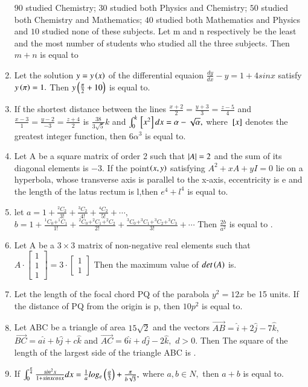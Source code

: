 \documentclass[journal]{IEEEtran}
\begin{document}
\begin{enumerate}[start=16]
$90$ studied Chemistry; $30$ studied both Physics and
Chemistry; $50$ studied both Chemistry and
Mathematics; $40$ studied both Mathematics and
Physics and $10$ studied none of these subjects. Let
m and n respectively be the least and the most
number of students who studied all the three
subjects. Then $m + n$ is equal to
\bigskip
\item Let the solution $y=y\left(x\right)$ of the differential equaion $\frac{dy}{dx}-y=1+4sinx$ satisfy $y\left(\pi\right)=1.$ Then $y\left(\frac{\pi}{2}+10\right)$ is equal to.
\bigskip
\item If the shortest distance between the lines $\frac{x+2}{2}=\frac{y+3}{3}=\frac{z-5}{4}$ and $\frac{x-3}{1}=\frac{y-2}{-3}=\frac{z+4}{2}$ is $\frac{38}{3\sqrt{5}}k$ and $\int_{0}^{k}{}\left[x^{2}\right]dx=\alpha-\sqrt{\alpha
},$ where ${}\left[x\right]$ denotes the greatest integer function, then $6\alpha^{3}$ is equal to.
\bigskip
\item Let A be a square matrix of order 2 such that $\left\vert A\right\vert=2$
and the sum of its diagonal elements is $-3.$ If the point$\left(x,y\right)$ satisfying $A^{2}+xA+yI=0$ lie
on a hyperbola, whose transverse axis is parallel to
the x-axis, eccentricity is e and the length of the
latus rectum is l,then $e^{4}+l^{4}$ is equal to.
\bigskip
\item let $a=1+\frac{^2C_2}{3!}+\frac{^3C_2}{4!}+\frac{^4C_2}{5!}+\cdots,$
$b=1+\frac{^1C_0+^1C_1}{1!}+\frac{^2C_0+^2C_1+^2C_2}{2!}+\frac{^3C_0+^3C_1+^3C_2+^3C_3}{3!}+\cdots$ Then $\frac{2b}{a^{2}}$ is equal to .
\bigskip
\item Let A be a $3\times3$ matrix of non-negative real
elements such that $A \cdot \begin{bmatrix} 1 \\ 1 \\ 1 \end{bmatrix} = 3 \cdot \begin{bmatrix} 1 \\ 1 \end{bmatrix}
$ Then the maximum value of $det\left(A\right)$ is.
\bigskip
\item Let the length of the focal chord PQ of the
parabola $y^{2} = 12x$ be 15 units. If the distance of PQ
from the origin is p, then $10p^{2}$ is equal to.
\bigskip
\item Let ABC be a triangle of area $15\sqrt{2}$ and the vectors $\overrightarrow{AB}=\hat{i}+2\hat{j}-7\hat{k},$ $\overrightarrow{BC}=a\hat{i}+b\hat{j}+c\hat{k}$ and $\overrightarrow{AC}=6\hat{i}+d\hat{j}-2\hat{k},$ $d>0.$ Then The square of the length of the largest side of the triangle ABC is .
\bigskip
\item If $\int_{0}^{\frac{\pi}{4}}\frac{sin^{2}x}{1+sinxcosx}dx=\frac{1}{a}log_e\left(\frac{a}{3}\right)+\frac{\pi}{b\sqrt{3}},$ where $a,b\in N ,$ then $a+b$ is equal to. 
\end{enumerate}
\end{document}
